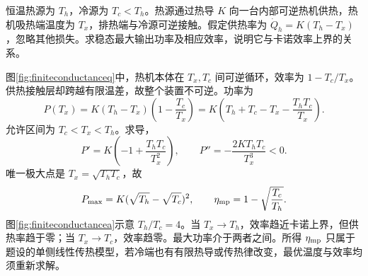 \begin{example}[有限供热速率下的最大功率]
\label{ex:finiteconductance}
恒温热源为 $T_h$，冷源为 $T_c<T_h$。热源通过热导 $K$ 向一台内部可逆热机供热，热机吸热端温度为 $T_x$，排热端与冷源可逆接触。假定供热率为 $\dot Q_h=K(T_h-T_x)$，忽略其他损失。求稳态最大输出功率及相应效率，说明它与卡诺效率上界的关系。
\end{example}
\begin{solution}
图\ref{fig:finiteconductanceq}中，热机本体在 $T_x,T_c$ 间可逆循环，效率为 $1-T_c/T_x$。供热接触层却跨越有限温差，故整个装置不可逆。功率为
\[
 P(T_x)=K(T_h-T_x)\left(1-\frac{T_c}{T_x}\right)
 =K\left(T_h+T_c-T_x-\frac{T_hT_c}{T_x}\right).
\]
允许区间为 $T_c<T_x<T_h$。求导，
\[
 P'=K\left(-1+\frac{T_hT_c}{T_x^2}\right),\qquad
 P''=-\frac{2KT_hT_c}{T_x^3}<0.
\]
唯一极大点是 $T_x=\sqrt{T_hT_c}$，故
\[
 P_{\max}=K(\sqrt{T_h}-\sqrt{T_c})^2,\qquad
 \eta_{\rm mp}=1-\sqrt{\frac{T_c}{T_h}}.
\]
图\ref{fig:finiteconductancea}示意 $T_h/T_c=4$。当 $T_x\to T_h$，效率趋近卡诺上界，但供热率趋于零；当 $T_x\to T_c$，效率趋零。最大功率介于两者之间。所得 $\eta_{\rm mp}$ 只属于题设的单侧线性传热模型，若冷端也有有限热导或传热律改变，最优温度与效率均须重新求解。
\end{solution}

